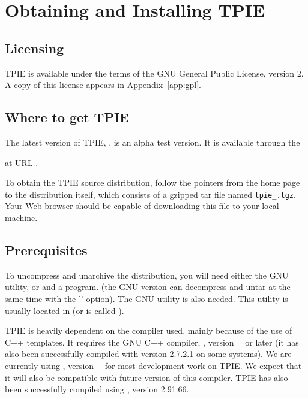 \chapter{Obtaining and Installing TPIE}

\section{Licensing}

TPIE is available under the terms of the GNU General Public License,
 version 2.  A copy of this license appears in
Appendix~\ref{app:gpl}.

\section{Where to get TPIE}

The latest version of TPIE, \version, is an alpha test version.  It is
available through the %
\begin{latexonly}
at URL .
\end{latexonly}
To obtain the TPIE source distribution, follow
the pointers from the home page to the distribution itself, which consists
of a gzipped tar file named {\tt tpie\_\version.tgz}. Your Web browser
should be capable of downloading this file to your local machine.


\section{Prerequisites}
\label{sec:gnu-software}

To uncompress and unarchive the distribution, you will need either the GNU
 utility, or  and a  program. (the GNU
version can decompress and untar at the same time with the ''
option). The GNU  utility is also needed. This utility is
usually located in  (or is called
).

TPIE is heavily dependent on the compiler used, mainly
because of the use of C++ templates. It requires the GNU C++
compiler, , version~\gxxversion~ or later (it has
also been successfully compiled with  version
2.7.2.1 on some systems). We are currently using ,
version~\gxxcurrent~ for most development work on TPIE. We
expect that it will also be compatible with future version
of this compiler. TPIE has also been successfully compiled
using , version 2.91.66.

